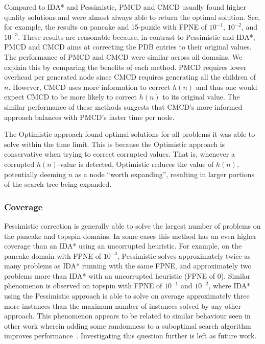 \documentclass[letterpaper]{article}
\begin{document}
Compared to IDA* and Pessimistic, PMCD and CMCD usually found higher quality solutions  and were almost always able to return the optimal solution. See, for example, the results on pancake and 15-puzzle with FPNE of $10^{-1}$, $10^{-2}$, and $10^{-3}$. These results are reasonable because, in contrast to Pessimistic and IDA*, PMCD and CMCD aims at correcting the PDB entries to their original values. %
%
The performance of PMCD and CMCD were similar across all domains. We explain this by comparing the benefits of each method. PMCD requires lower overhead per generated node since CMCD requires generating all the children of $n$. However, CMCD uses more information to correct $h(n)$ and thus one would expect CMCD to be more likely to correct $h(n)$ to its original value. The similar performance of these methods suggests that CMCD's more informed approach balances with PMCD's faster time per node.

The Optimistic approach found optimal solutions for all problems it was able to solve within the time limit. This is because the Optimistic approach is conservative when trying to correct corrupted values. That is, whenever a corrupted $h(n)$-value is detected, Optimistic reduces the value of $h(n)$, potentially deeming $n$ as a node ``worth expanding'', resulting in larger portions of the search tree being expanded.


\subsubsection{Coverage}

Pessimistic correction is generally able to solve the largest number of problems on the pancake and topspin domains. In some cases this method has an even higher coverage than an IDA* using an uncorrupted heuristic. For example, on the pancake domain with FPNE of $10^{-3}$, Pessimistic solves approximately twice as many problems as IDA* running with the same FPNE, and approximately two problems more than IDA* with an uncorrupted heuristic (FPNE of $0$). %
Similar phenomenon is observed on topspin with FPNE of $10^{-1}$ and $10^{-2}$, where IDA* using the Pessimistic approach is able to solve on average approximately three more instances than the maximum number of instances solved by any other approach.
This phenomenon appears to be related to similar behaviour seen in other work wherein  adding some randomness to a suboptimal search algorithm improves performance~\cite{valenzano2014comparison}. Investigating this question further is left as future work.
\end{document}
